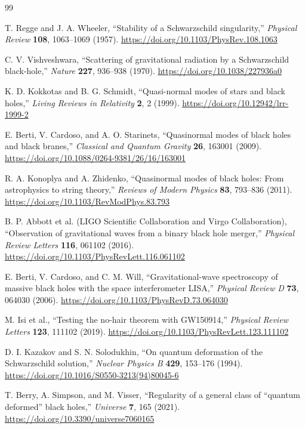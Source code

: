 \documentclass[10pt,letterpaper,twocolumn]{article}
\begin{document}
\begin{thebibliography}{99}

T. Regge and J. A. Wheeler,
``Stability of a Schwarzschild singularity,''
\emph{Physical Review} \textbf{108}, 1063--1069 (1957).
\url{https://doi.org/10.1103/PhysRev.108.1063}

C. V. Vishveshwara,
``Scattering of gravitational radiation by a Schwarzschild black-hole,''
\emph{Nature} \textbf{227}, 936--938 (1970).
\url{https://doi.org/10.1038/227936a0}

K. D. Kokkotas and B. G. Schmidt,
``Quasi-normal modes of stars and black holes,''
\emph{Living Reviews in Relativity} \textbf{2}, 2 (1999).
\url{https://doi.org/10.12942/lrr-1999-2}

E. Berti, V. Cardoso, and A. O. Starinets,
``Quasinormal modes of black holes and black branes,''
\emph{Classical and Quantum Gravity} \textbf{26}, 163001 (2009).
\url{https://doi.org/10.1088/0264-9381/26/16/163001}

R. A. Konoplya and A. Zhidenko,
``Quasinormal modes of black holes: From astrophysics to string theory,''
\emph{Reviews of Modern Physics} \textbf{83}, 793--836 (2011).
\url{https://doi.org/10.1103/RevModPhys.83.793}

B. P. Abbott et al. (LIGO Scientific Collaboration and Virgo Collaboration),
``Observation of gravitational waves from a binary black hole merger,''
\emph{Physical Review Letters} \textbf{116}, 061102 (2016).
\url{https://doi.org/10.1103/PhysRevLett.116.061102}

E. Berti, V. Cardoso, and C. M. Will,
``Gravitational-wave spectroscopy of massive black holes with the space interferometer LISA,''
\emph{Physical Review D} \textbf{73}, 064030 (2006).
\url{https://doi.org/10.1103/PhysRevD.73.064030}

M. Isi et al.,
``Testing the no-hair theorem with GW150914,''
\emph{Physical Review Letters} \textbf{123}, 111102 (2019).
\url{https://doi.org/10.1103/PhysRevLett.123.111102}

D. I. Kazakov and S. N. Solodukhin,
``On quantum deformation of the Schwarzschild solution,''
\emph{Nuclear Physics B} \textbf{429}, 153--176 (1994).
\url{https://doi.org/10.1016/S0550-3213(94)80045-6}

T. Berry, A. Simpson, and M. Visser,
``Regularity of a general class of ``quantum deformed'' black holes,''
\emph{Universe} \textbf{7}, 165 (2021).
\url{https://doi.org/10.3390/universe7060165}


\end{thebibliography}
\end{document}
